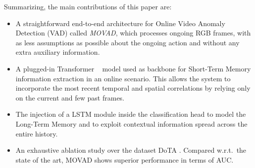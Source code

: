 Summarizing, the main contributions of this paper are:
\begin{itemize}%
    \item A straightforward end-to-end architecture for Online Video Anomaly Detection (VAD) called \emph{MOVAD}, which processes ongoing RGB frames, with as less assumptions as possible about the ongoing action and without any extra auxiliary information.
    \item A plugged-in Transformer ~\cite{liu_video_2022} model used as backbone for Short-Term Memory information extraction in an online scenario.
    This allows the system to incorporate the most recent temporal and spatial correlations by relying only on the current and few past frames.
    \item The injection of a LSTM module inside the classification head to model the Long-Term Memory and to exploit contextual information spread across the entire history.
    \item An exhaustive ablation study over the dataset DoTA \cite{9712446}.
    Compared w.r.t.~the state of the art, MOVAD shows superior performance in terms of AUC.
\end{itemize}